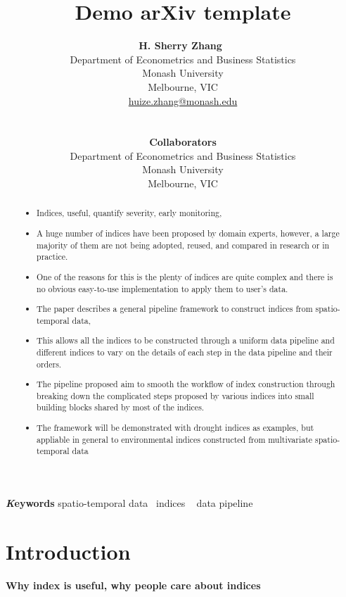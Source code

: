 \documentclass[
]{article}
\title{Demo arXiv template}
\author{
\textbf{H. Sherry Zhang}~\orcidlink{0000-0002-7122-1463}\\Department of
Econometrics and Business Statistics\\Monash University\\Melbourne,
VIC\\\href{mailto:huize.zhang@monash.edu}{huize.zhang@monash.edu}\\\\\\
\textbf{Collaborators}\\Department of Econometrics and Business
Statistics\\Monash University\\Melbourne, VIC\\}
\date{}
\providecommand{\tightlist}{%
  \setlength{\itemsep}{0pt}\setlength{\parskip}{0pt}}\usepackage{longtable,booktabs,array}
\begin{document}
\maketitle
\begin{abstract}
\begin{itemize}
\tightlist
\item
  Indices, useful, quantify severity, early monitoring,
\item
  A huge number of indices have been proposed by domain experts,
  however, a large majority of them are not being adopted, reused, and
  compared in research or in practice.
\item
  One of the reasons for this is the plenty of indices are quite complex
  and there is no obvious easy-to-use implementation to apply them to
  user's data.
\item
  The paper describes a general pipeline framework to construct indices
  from spatio-temporal data,
\item
  This allows all the indices to be constructed through a uniform data
  pipeline and different indices to vary on the details of each step in
  the data pipeline and their orders.
\item
  The pipeline proposed aim to smooth the workflow of index construction
  through breaking down the complicated steps proposed by various
  indices into small building blocks shared by most of the indices.
\item
  The framework will be demonstrated with drought indices as examples,
  but appliable in general to environmental indices constructed from
  multivariate spatio-temporal data
\end{itemize}
\end{abstract}
{\bfseries \emph Keywords}
\def\sep{\textbullet\ }
spatio-temporal data \sep indices \sep 
data pipeline

\ifdefined\Shaded\renewenvironment{Shaded}{\begin{tcolorbox}[borderline west={3pt}{0pt}{shadecolor}, breakable, boxrule=0pt, frame hidden, interior hidden, enhanced, sharp corners]}{\end{tcolorbox}}\fi

\newpage

\hypertarget{introduction}{%
\section{Introduction}\label{introduction}}

\textbf{Why index is useful, why people care about indices}
\end{document}

